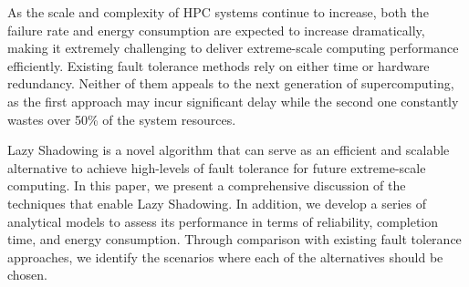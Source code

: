 As the scale and complexity of HPC systems continue to increase, both the failure rate and energy consumption are expected to increase dramatically, making it extremely challenging to deliver extreme-scale computing performance efficiently. Existing fault tolerance methods rely on either time or hardware redundancy. Neither of them appeals to the next generation of supercomputing, as the first approach may incur significant delay while the second one constantly wastes over 50\% of the system resources. %

Lazy Shadowing is a novel algorithm that can serve as an efficient and scalable alternative to achieve high-levels of fault tolerance for future extreme-scale computing. In this paper, we present a comprehensive discussion of the techniques that enable Lazy Shadowing. In addition, we develop a series of analytical models to assess its performance in terms of reliability, completion time, and energy consumption. 
Through comparison with existing fault tolerance approaches, we identify the scenarios where each of the alternatives should be chosen. %

